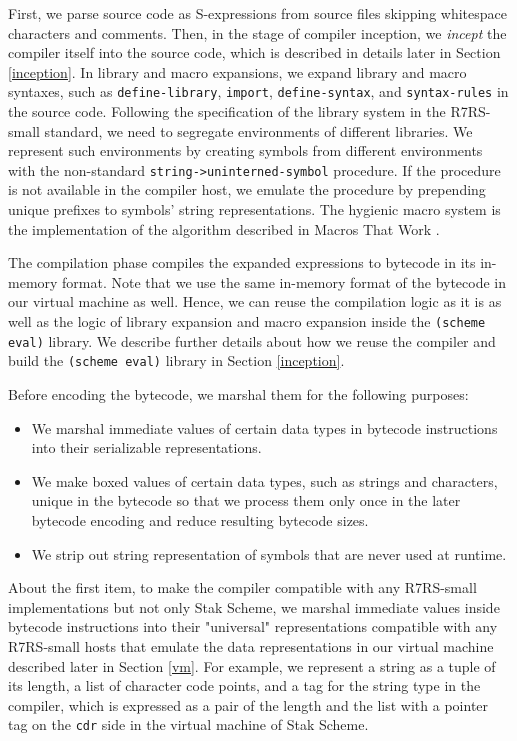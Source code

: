 \documentclass[sigplan, anonymous, review]{acmart}
\begin{document}
First, we parse source code as S-expressions from source
files skipping whitespace characters and comments.
Then, in the stage of compiler inception, we \textit{incept} the compiler
itself into the source code, which is described in details later in
Section \ref{inception}.
In library and macro expansions, we expand library and macro
syntaxes, such as \texttt{define-library}, \texttt{import},
\texttt{define-syntax}, and \texttt{syntax-rules} in the source code.
Following the specification of the library system in the R7RS-small
standard, we need to segregate environments of different libraries.
We represent such environments by creating symbols from
different environments with the non-standard
\texttt{string->uninterned-symbol} procedure.
If the procedure is not available in the compiler host, we emulate
the procedure by prepending unique prefixes to symbols' string
representations.
The hygienic macro system is the implementation of the
algorithm described in Macros That Work \cite{macrosthatwork}.

The compilation phase compiles the expanded expressions to
bytecode in its in-memory format. Note that we use the same
in-memory format of the bytecode in our virtual machine as well.
Hence, we can reuse the compilation logic as it is
as well as the logic of library expansion and macro expansion inside
the \texttt{(scheme eval)} library.
We describe further details about how we reuse the compiler and build
the \texttt{(scheme eval)} library in Section \ref{inception}.

Before encoding the bytecode, we marshal them for the following purposes:

\begin{itemize}
  \item We marshal immediate values of certain data types in bytecode
    instructions into their serializable representations.
  \item We make boxed values of certain data types, such as strings and
    characters, unique in the bytecode so that we process them only once
    in the later bytecode encoding and reduce resulting bytecode sizes.
  \item We strip out string representation of symbols that are never used
    at runtime.
\end{itemize}

About the first item, to make the compiler compatible with any R7RS-small
implementations but not only Stak Scheme, we marshal immediate values
inside bytecode instructions into their "universal"
representations compatible with any R7RS-small hosts that emulate
the data representations in our virtual machine
described later in Section \ref{vm}.
For example, we represent a string as a tuple of its length, a list of
character code points, and a tag for the string type in the compiler,
which is expressed as a pair of the length and the list
with a pointer tag on the \texttt{cdr} side in the virtual
machine of Stak Scheme.
\end{document}
